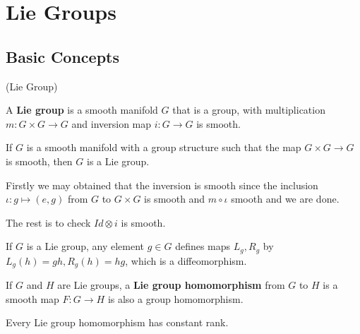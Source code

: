 \section{Lie Groups}

\subsection{Basic Concepts}

\begin{definition}(Lie Group)\par
    A \textbf{Lie group} is a smooth manifold $G$ that is a group, with multiplication $m:G\times G \to G$ and inversion map $i:G\to G$ is smooth.
\end{definition}

\begin{proposition}
    If $G$ is a smooth manifold with a group structure such that the map $G\times G \to G$ is smooth, then $G$ is a Lie group.
\end{proposition}
\Pf\par
    Firstly we may obtained that the inversion is smooth since the inclusion $\iota: g\mapsto (e,g)$ from $G$ to $G\times G$ is smooth and $m\circ\iota$ smooth and we are done.\par
    The rest is to check $Id \otimes i $ is smooth.

\begin{definition}
    If $G$ is a Lie group, any element $g\in G$ defines maps $L_g,R_g$ by $L_g(h) = gh, R_g(h) = hg$, which is a diffeomorphism.
\end{definition}

\begin{definition}
    If $G$ and $H$ are Lie groups, a \textbf{Lie group homomorphism} from $G$ to $H$ is a smooth map $F:G\to H$ is also a group homomorphism.
\end{definition}

\begin{theorem}
    Every Lie group homomorphism has constant rank.
\end{theorem}
